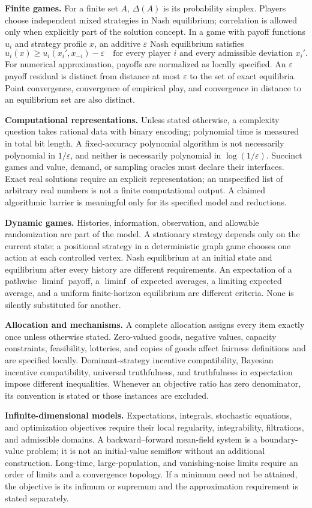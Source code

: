 \documentclass[11pt,a4paper]{article}
\begin{document}
\textbf{Finite games.} For a finite set $A$, $\Delta(A)$ is its probability
simplex. Players choose independent mixed strategies in Nash equilibrium;
correlation is allowed only when explicitly part of the solution concept.
In a game with payoff functions $u_i$ and strategy profile $x$, an additive
$\varepsilon$ Nash equilibrium satisfies
\[
 u_i(x)\geq u_i(x_i',x_{-i})-\varepsilon
 \quad\text{for every player $i$ and every admissible deviation $x_i'$}.
\]
For numerical approximation, payoffs are normalized as locally specified.
An $\varepsilon$ payoff residual is distinct from distance at most
$\varepsilon$ to the set of exact equilibria. Point convergence, convergence
of empirical play, and convergence in distance to an equilibrium set are
also distinct.

\textbf{Computational representations.} Unless stated otherwise, a complexity
question takes rational data with binary encoding; polynomial time is measured
in total bit length. A fixed-accuracy polynomial algorithm is not necessarily
polynomial in $1/\varepsilon$, and neither is necessarily polynomial in
$\log(1/\varepsilon)$. Succinct games and value, demand, or sampling oracles
must declare their interfaces. Exact real solutions require an explicit
representation; an unspecified list of arbitrary real numbers is not a
finite computational output. A claimed algorithmic barrier is meaningful
only for its specified model and reductions.

\textbf{Dynamic games.} Histories, information, observation, and allowable
randomization are part of the model. A stationary strategy depends only on
the current state; a positional strategy in a deterministic graph game
chooses one action at each controlled vertex. Nash equilibrium at an initial
state and equilibrium after every history are different requirements.
An expectation of a pathwise $\liminf$ payoff, a $\liminf$ of expected averages,
a limiting expected average, and a uniform finite-horizon equilibrium are
different criteria. None is silently substituted for another.

\textbf{Allocation and mechanisms.} A complete allocation assigns every item
exactly once unless otherwise stated. Zero-valued goods, negative values,
capacity constraints, feasibility, lotteries, and copies of goods affect
fairness definitions and are specified locally. Dominant-strategy incentive
compatibility, Bayesian incentive compatibility, universal truthfulness,
and truthfulness in expectation impose different inequalities. Whenever
an objective ratio has zero denominator, its convention is stated or those
instances are excluded.

\textbf{Infinite-dimensional models.} Expectations, integrals, stochastic
equations, and optimization objectives require their local regularity,
integrability, filtrations, and admissible domains. A backward--forward
mean-field system is a boundary-value problem; it is not an initial-value
semiflow without an additional construction. Long-time, large-population,
and vanishing-noise limits require an order of limits and a convergence
topology. If a minimum need not be attained, the objective is its infimum
or supremum and the approximation requirement is stated separately.
\end{document}
